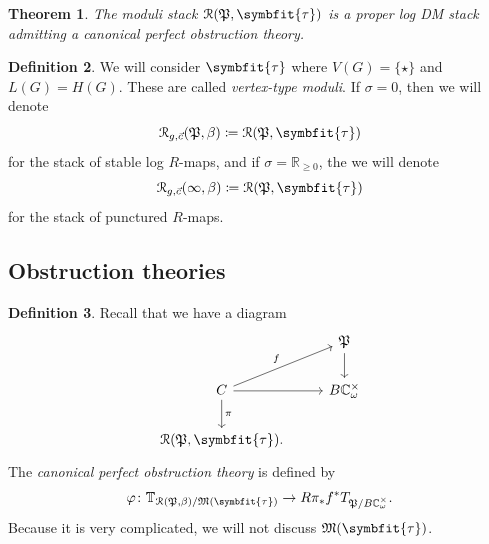 \documentclass[10pt,oldfontcommands,oneside]{memoir}
\newtheorem{thm}{Theorem}[section]
\theoremstyle{definition}
\newtheorem{defn}[thm]{Definition}
\theoremstyle{remark}
\theoremstyle{plain}
\theoremstyle{definition}
\theoremstyle{remark}
\newcommand{\R}{\mathbb{R}}
\newcommand{\C}{\mathbb{C}}
\newcommand{\mc}[1]{\mathcal{#1}}
\newcommand{\mf}[1]{\mathfrak{#1}}
\newcommand{\btau}{\symbfit{\tau}}
\newcommand{\1}{\mathbf{1}}
\newcommand{\2}{\mathbf{2}}
\newcommand{\3}{\mathbf{3}}
\begin{document}
\begin{thm}
    The moduli stack $\mc{R}(\mf{P}, \symbfit{\tau})$ is a proper log DM stack admitting a canonical perfect obstruction theory.
\end{thm}


\begin{defn}
    We will consider $\symbfit{\tau}$ where $V(G) = \{\star\}$ and $L(G) = H(G)$. These are called \textit{vertex-type moduli}. If $\sigma = 0$, then we will denote
    \[ \mc{R}_{g,\vec{c}}(\mf{P}, \beta) \coloneqq \mc{R}(\mf{P}, \symbfit{\tau}) \]
    for the stack of stable log $R$-maps,
    and if $\sigma = \R_{\geq 0}$, the we will denote
    \[ \mc{R}_{g,\vec{c}}(\infty, \beta) \coloneqq \mc{R}(\mf{P}, \btau) \]
    for the stack of punctured $R$-maps.
\end{defn}

\subsection{Obstruction theories}%
\label{sub:The canonical perfect obstruction theory}


\begin{defn}
    Recall that we have a diagram
    \begin{equation*}
    \begin{tikzcd}
        & \mf{P} \ar{d} \\
        C \ar{r} \ar{d}{\pi} \ar{ur}{f} & B \C_{\omega}^{\times} \\
        \mc{R}(\mf{P}, \btau).
    \end{tikzcd}
    \end{equation*}
    The \textit{canonical perfect obstruction theory} is defined by
    \[ \varphi \colon \mathbb{T}_{\mc{R}(\mf{P}, \beta)/\mf{M}(\btau)} \to R \pi_* f^* T_{\mf{P}/B\C_{\omega}^{\times}}. \]
    Because it is very complicated, we will not discuss $\mf{M}(\btau)$.
\end{defn}
\end{document}
